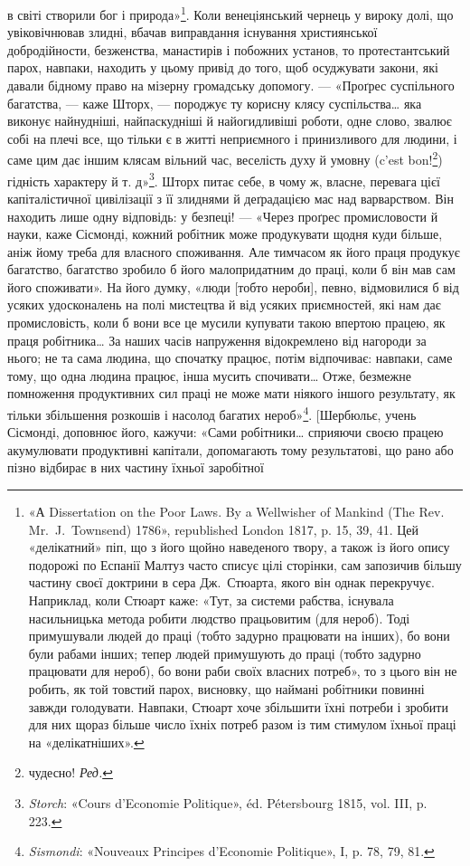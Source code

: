 \parcont{}  %
в світі створили бог і природа»\footnote{
«А Dissertation on the Poor Laws. By a Wellwisher of Mankind
(The Rev. Mr.~J.~Townsend) 1786», republished London 1817, p. 15, 39,
41. Цей «делікатний» піп, що з його щойно наведеного твору, а також із
його опису подорожі по Еспанії Малтуз часто списує цілі сторінки, сам
запозичив більшу частину своєї доктрини в сера Дж.~Стюарта, якого він
однак перекручує. Наприклад, коли Стюарт каже: «Тут, за системи рабства,
існувала насильницька метода робити людство працьовитим (для
нероб). Тоді примушували людей до праці (тобто задурно працювати на
інших), бо вони були рабами інших; тепер людей примушують до праці
(тобто задурно працювати для нероб), бо вони раби своїх власних потреб»,
то з цього він не робить, як той товстий парох, висновку, що наймані
робітники повинні завжди голодувати. Навпаки, Стюарт хоче збільшити
їхні потреби і зробити для них щораз більше число їхніх потреб разом
із тим стимулом їхньої праці на «делікатніших».
}. Коли венеціянський чернець
у вироку долі, що увіковічнював злидні, вбачав виправдання
існування християнської добродійности, безженства, манастирів
і побожних установ, то протестантський парох, навпаки, находить
у цьому привід до того, щоб осуджувати закони, які давали бідному
право на мізерну громадську допомогу. — «Проґрес суспільного
багатства, — каже Шторх, — породжує ту корисну клясу суспільства\dots{}
яка виконує найнудніші, найпаскудніші й найогидливіші
роботи, одне слово, звалює собі на плечі все, що тільки є в житті
неприємного і принизливого для людини, і саме цим дає іншим
клясам вільний час, веселість духу й умовну (c’est bon!\footnote*{
чудесно! \emph{Ред.}
}) гідність
характеру й т. д»\footnote{
\emph{Storch}: «Cours d’Economie Politique», éd. Pétersbourg 1815, vol. III,
p. 223.
}. Шторх питає себе, в чому ж, власне,
перевага цієї капіталістичної цивілізації з її злиднями й деґрадацією
мас над варварством. Він находить лише одну відповідь:
у безпеці! — «Через проґрес промисловости й науки, каже Сісмонді,
кожний робітник може продукувати щодня куди більше,
аніж йому треба для власного споживання. Але тимчасом як
його праця продукує багатство, багатство зробило б його малопридатним
до праці, коли б він мав сам його споживати». На його
думку, «люди [тобто нероби], певно, відмовилися б від усяких
удосконалень на полі мистецтва й від усяких приємностей, які
нам дає промисловість, коли б вони все це мусили купувати
такою впертою працею, як праця робітника\dots{} За наших часів
напруження відокремлено від нагороди за нього; не та сама людина,
що спочатку працює, потім відпочиває: навпаки, саме
тому, що одна людина працює, інша мусить спочивати\dots{} Отже,
безмежне помноження продуктивних сил праці не може мати
ніякого іншого результату, як тільки збільшення розкошів і
насолод багатих нероб»\footnote{
\emph{Sismondi}: «Nouveaux Principes d’Economie Politique», I, p. 78,
79, 81.
}. [Шербюльє, учень Сісмонді, доповнює
його, кажучи: «Сами робітники\dots{} сприяючи своєю працею акумулювати
продуктивні капітали, допомагають тому результатові,
що рано або пізно відбирає в них частину їхньої заробітної
\parbreak{}  %
